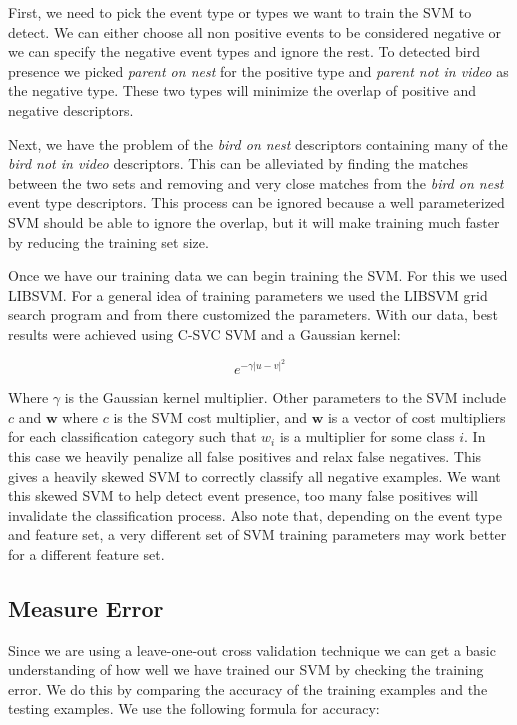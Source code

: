 First, we need to pick the event type or types we want to train the SVM to detect. We can either choose all non positive events to be considered negative or we can specify the negative event types and ignore the rest. To detected bird presence we picked \emph{parent on nest} for the positive type and \emph{parent not in video} as the negative type. These two types will minimize the overlap of positive and negative descriptors.

Next, we have the problem of the \emph{bird on nest} descriptors containing many of the \emph{bird not in video} descriptors. This can be alleviated by finding the matches between the two sets and removing and very close matches from the \emph{bird on nest} event type descriptors. This process can be ignored because a well parameterized SVM should be able to ignore the overlap, but it will make training much faster by reducing the training set size.

Once we have our training data we can begin training the SVM\@. For this we used LIBSVM\cite{chang_2011_libsvm}. For a general idea of training parameters we used the LIBSVM grid search program and from there customized the parameters. With our data, best results were achieved using C-SVC SVM and a Gaussian kernel:

\begin{equation}
e^{-\gamma{\lvert u-v \rvert}^2}
\label{eq:svm_gaussian}
\end{equation}

Where $\gamma$ is the Gaussian kernel multiplier. Other parameters to the SVM include $c$ and $\bm{w}$ where $c$ is the SVM cost multiplier, and $\bm{w}$ is a vector of cost multipliers for each classification category such that $w_i$ is a multiplier for some class $i$. In this case we heavily penalize all false positives and relax false negatives. This gives a heavily skewed SVM to correctly classify all negative examples. We want this skewed SVM to help detect event presence, too many false positives will invalidate the classification process. Also note that, depending on the event type and feature set, a very different set of SVM training parameters may work better for a different feature set.


\subsection{Measure Error}
\label{sec:measure_error}

Since we are using a leave-one-out cross validation technique we can get a basic understanding of how well we have trained our SVM by checking the training error. We do this by comparing the accuracy of the training examples and the testing examples. We use the following formula for accuracy:

